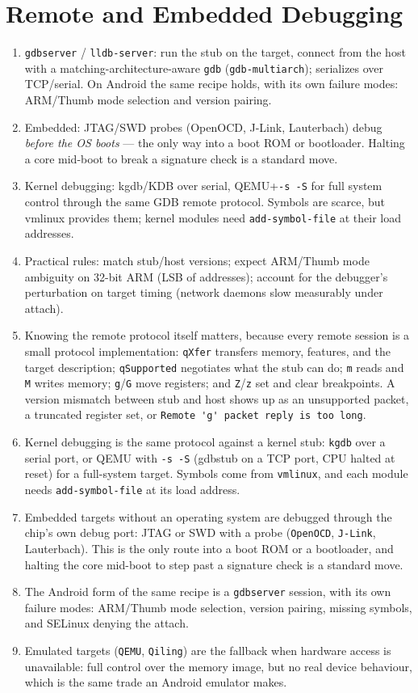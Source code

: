 \documentclass[12pt]{Training}
\begin{document}
\section*{Remote and Embedded Debugging}
\begin{enumerate}
    \item \lstinline{gdbserver} / \lstinline{lldb-server}: run the stub on the target, connect from the host with a matching-architecture-aware \lstinline{gdb} (\lstinline{gdb-multiarch}); serializes over TCP/serial. On Android the same recipe holds, with its own failure modes: ARM/Thumb mode selection and version pairing.
    \item Embedded: JTAG/SWD probes (OpenOCD, J-Link, Lauterbach) debug \emph{before the OS boots} --- the only way into a boot ROM or bootloader. Halting a core mid-boot to break a signature check is a standard move.
    \item Kernel debugging: kgdb/KDB over serial, QEMU+\lstinline{-s -S} for full system control through the same GDB remote protocol. Symbols are scarce, but vmlinux provides them; kernel modules need \lstinline{add-symbol-file} at their load addresses.
    \item Practical rules: match stub/host versions; expect ARM/Thumb mode ambiguity on 32-bit ARM (LSB of addresses); account for the debugger's perturbation on target timing (network daemons slow measurably under attach).
    \item Knowing the remote protocol itself matters, because every remote session is a small protocol implementation: \lstinline{qXfer} transfers memory, features, and the target description; \lstinline{qSupported} negotiates what the stub can do; \lstinline{m} reads and \lstinline{M} writes memory; \lstinline{g}/\lstinline{G} move registers; and \lstinline{Z}/\lstinline{z} set and clear breakpoints. A version mismatch between stub and host shows up as an unsupported packet, a truncated register set, or \lstinline{Remote 'g' packet reply is too long}.
    \item Kernel debugging is the same protocol against a kernel stub: \lstinline{kgdb} over a serial port, or QEMU with \lstinline{-s -S} (gdbstub on a TCP port, CPU halted at reset) for a full-system target. Symbols come from \lstinline{vmlinux}, and each module needs \lstinline{add-symbol-file} at its load address.
    \item Embedded targets without an operating system are debugged through the chip's own debug port: JTAG or SWD with a probe (\lstinline{OpenOCD}, \lstinline{J-Link}, Lauterbach). This is the only route into a boot ROM or a bootloader, and halting the core mid-boot to step past a signature check is a standard move.
    \item The Android form of the same recipe is a \lstinline{gdbserver} session, with its own failure modes: ARM/Thumb mode selection, version pairing, missing symbols, and SELinux denying the attach.
    \item Emulated targets (\lstinline{QEMU}, \lstinline{Qiling}) are the fallback when hardware access is unavailable: full control over the memory image, but no real device behaviour, which is the same trade an Android emulator makes.
\end{enumerate}
\end{document}
